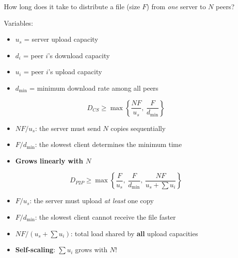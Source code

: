 \begin{keybox}
How long does it take to distribute a file (size $F$) from \textit{one} server to $N$ peers?

Variables:
\begin{itemize}[noitemsep]
    \item $u_s$ = server upload capacity
    \item $d_i$ = peer $i$'s download capacity
    \item $u_i$ = peer $i$'s upload capacity
    \item $d_{\min}$ = minimum download rate among all peers
\end{itemize}
\end{keybox}

\begin{formulabox}
$$D_{CS} \geq \max\left\{\frac{NF}{u_s},\ \frac{F}{d_{\min}}\right\}$$
\begin{itemize}[noitemsep]
    \item $NF/u_s$: the server must send $N$ copies sequentially
    \item $F/d_{\min}$: the slowest client determines the minimum time
    \item \textbf{Grows linearly with $N$}
\end{itemize}
\end{formulabox}

\begin{formulabox}
$$D_{P2P} \geq \max\left\{\frac{F}{u_s},\ \frac{F}{d_{\min}},\ \frac{NF}{u_s + \sum u_i}\right\}$$
\begin{itemize}[noitemsep]
    \item $F/u_s$: the server must upload \textit{at least} one copy
    \item $F/d_{\min}$: the slowest client cannot receive the file faster
    \item $NF/(u_s + \sum u_i)$: total load shared by \textbf{all} upload capacities
    \item \textbf{Self-scaling}: $\sum u_i$ grows with $N$!
\end{itemize}
\end{formulabox}


